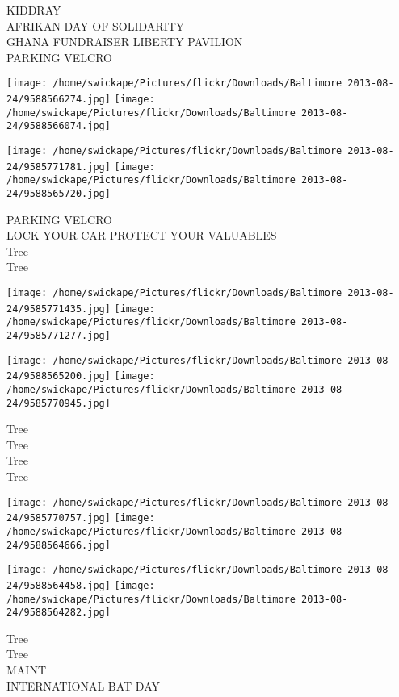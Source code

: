 \documentclass[10pt,letterpaper]{article}
\begin{document}
KIDDRAY\\
AFRIKAN DAY OF SOLIDARITY\\
GHANA FUNDRAISER LIBERTY PAVILION\\
PARKING VELCRO\\
\pagebreak

\texttt{[image: /home/swickape/Pictures/flickr/Downloads/Baltimore 2013-08-24/9588566274.jpg]}
\texttt{[image: /home/swickape/Pictures/flickr/Downloads/Baltimore 2013-08-24/9588566074.jpg]}

\texttt{[image: /home/swickape/Pictures/flickr/Downloads/Baltimore 2013-08-24/9585771781.jpg]}
\texttt{[image: /home/swickape/Pictures/flickr/Downloads/Baltimore 2013-08-24/9588565720.jpg]}

PARKING VELCRO\\
LOCK YOUR CAR PROTECT YOUR VALUABLES\\
Tree\\
Tree\\
\pagebreak

\texttt{[image: /home/swickape/Pictures/flickr/Downloads/Baltimore 2013-08-24/9585771435.jpg]}
\texttt{[image: /home/swickape/Pictures/flickr/Downloads/Baltimore 2013-08-24/9585771277.jpg]}

\texttt{[image: /home/swickape/Pictures/flickr/Downloads/Baltimore 2013-08-24/9588565200.jpg]}
\texttt{[image: /home/swickape/Pictures/flickr/Downloads/Baltimore 2013-08-24/9585770945.jpg]}

Tree\\
Tree\\
Tree\\
Tree\\
\pagebreak

\texttt{[image: /home/swickape/Pictures/flickr/Downloads/Baltimore 2013-08-24/9585770757.jpg]}
\texttt{[image: /home/swickape/Pictures/flickr/Downloads/Baltimore 2013-08-24/9588564666.jpg]}

\texttt{[image: /home/swickape/Pictures/flickr/Downloads/Baltimore 2013-08-24/9588564458.jpg]}
\texttt{[image: /home/swickape/Pictures/flickr/Downloads/Baltimore 2013-08-24/9588564282.jpg]}

Tree\\
Tree\\
MAINT\\
INTERNATIONAL BAT DAY\\
\pagebreak
\end{document}
